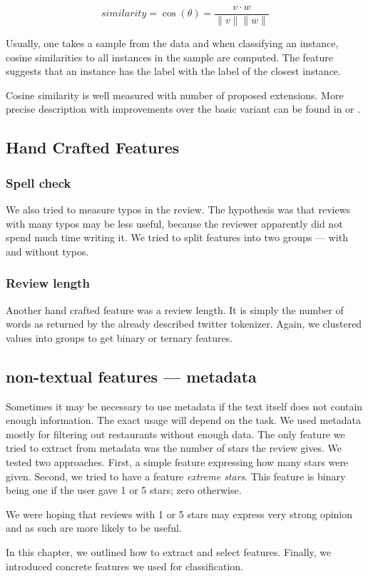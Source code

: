 \[
	\mathit{similarity} = \cos\left(\theta\right) = \frac{v \cdot w}{\|v\| \| w \|}
\]

Usually, one takes a sample from the data and when classifying an instance,
cosine similarities to all instances in the sample are computed.
The feature suggests that an instance has the label with the label of the closest instance.

Cosine similarity is well measured with number of proposed extensions.
More precise description with improvements over the basic variant can be found
in \citet{li2013distance} or \citet{mikawa2011proposal}.


\subsection{Hand Crafted Features}

\subsubsection{Spell check}

We also tried to measure typos in the review.
The hypothesis was that reviews with many typos may be less useful,
because the reviewer apparently did not spend much time writing it.
We tried to split features into two groups --- with and without typos.


\subsubsection{Review length}

Another hand crafted feature was a review length.
It is simply the number of words as returned by the already described twitter tokenizer.
Again, we clustered values into groups to get binary or ternary features.


\subsection{non-textual features --- metadata}

Sometimes it may be necessary to use metadata
if the text itself does not contain enough information.
The exact usage will depend on the task.
We used metadata mostly for filtering out restaurants without enough data.
The only feature we tried to extract from metadata was the number of stars the review gives.
We tested two approaches.
First, a simple feature expressing how many stars were given.
Second, we tried to have a feature \textit{extreme stars}.
This feature is binary being one if the user gave 1 or 5 stars;
zero otherwise.

We were hoping that reviews with 1 or 5 stars may express very strong opinion
and as such are more likely to be useful.

In this chapter, we outlined how to extract and select features.
Finally, we introduced concrete features we used for classification.
